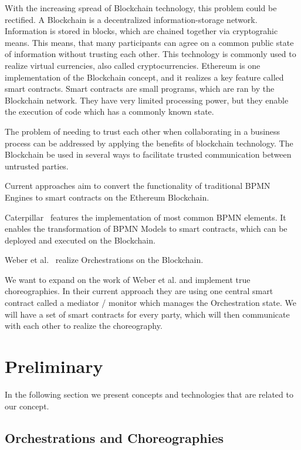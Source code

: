 \documentclass[runningheads]{llncs}
\begin{document}
With the increasing spread of Blockchain technology, this problem could be rectified.
A Blockchain is a decentralized information-storage network. Information is stored in blocks, which are chained together via cryptograhic means. This means, that many participants can agree on a common public state of information without trusting each other. This technology is commonly used to realize virtual currencies, also called cryptocurrencies.
Ethereum is one implementation of the Blockchain concept, and it realizes a key feature called smart contracts.
Smart contracts are small programs, which are ran by the Blockchain network. They have very limited processing power, but they enable the execution of code which has a commonly known state. 

The problem of needing to trust each other when collaborating in a business process can be addressed by applying the benefits of blockchain technology. The Blockchain be used in several ways to facilitate trusted communication between untrusted parties.

Current approaches aim to convert the functionality of traditional BPMN Engines to smart contracts on the Ethereum Blockchain.

Caterpillar~\cite{lopez2017caterpillar} features the implementation of most common BPMN elements. It enables the transformation of BPMN Models to smart contracts, which can be deployed and executed on the Blockchain.

Weber et al.~\cite{weber2016untrusted} realize Orchestrations on the Blockchain.

We want to expand on the work of Weber et al. and implement true choreographies. In their current approach they are using one central smart contract called a mediator / monitor which manages the Orchestration state.
We will have a set of smart contracts for every party, which will then communicate with each other to realize the choreography.

\section{Preliminary}
In the following section we present concepts and technologies that are related to our concept.

\subsection{Orchestrations and Choreographies}
\end{document}
